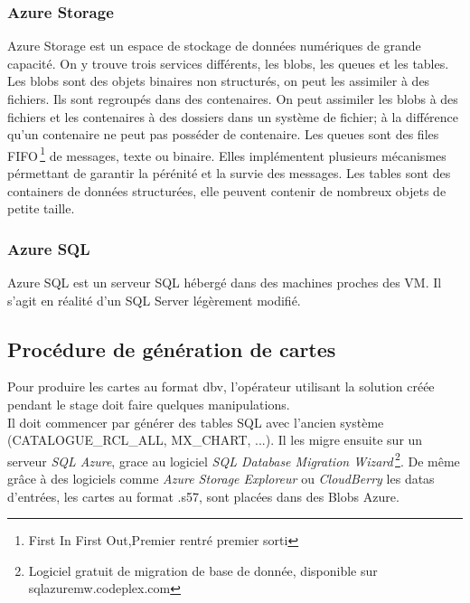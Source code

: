 \subsubsection{Azure Storage}
Azure Storage est un espace de stockage de données numériques de
grande capacité. On y trouve trois services différents, les blobs, les
queues et les tables.\\

Les blobs sont des objets binaires non structurés, on peut les
assimiler à des fichiers. Ils sont regroupés dans des contenaires. On
peut assimiler les blobs à des fichiers et les contenaires à des
dossiers dans un système de fichier; à la différence qu'un contenaire
ne peut pas posséder de contenaire. Les queues sont des files
FIFO\,\footnote{{First In First Out},Premier rentré premier sorti} de
messages, texte ou binaire. Elles implémentent plusieurs mécanismes
pérmettant de garantir la pérénité et la survie des messages. Les
tables sont des containers de données structurées, elle peuvent
contenir de nombreux objets de petite taille.\\



\subsubsection{Azure SQL}
Azure SQL est un serveur SQL hébergé dans des machines proches des
VM. Il s'agit en réalité d'un SQL Server légèrement modifié.\\



%
%

\subsection{Procédure de génération de cartes}

Pour produire les cartes au format dbv, l'opérateur utilisant la
solution créée pendant le stage doit faire quelques manipulations. \\

Il doit commencer par générer des tables SQL avec l'ancien système
(CATALOGUE\_RCL\_ALL, MX\_CHART, ...). Il les migre ensuite sur un
serveur \textit{SQL Azure}, grace au logiciel \textit{SQL Database
  Migration Wizard}\,\footnote{Logiciel gratuit de migration de base
  de donnée, disponible sur sqlazuremw.codeplex.com}. De même grâce à
des logiciels comme \textit{Azure Storage Exploreur} ou
\textit{CloudBerry} les datas d'entrées, les cartes au format .s57, sont
placées dans des Blobs Azure.\\

